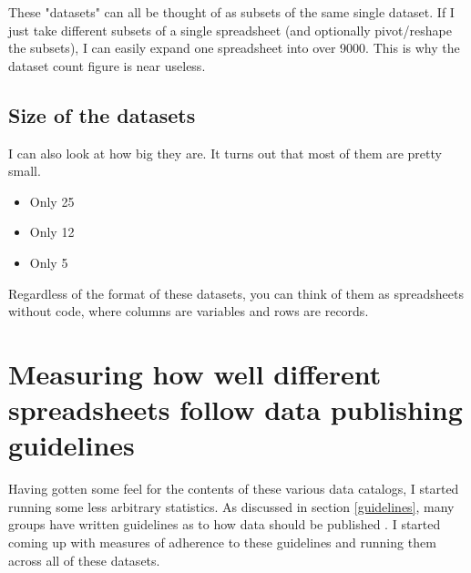 \documentclass{acm_proc_article-sp}
\begin{document}
These "datasets" can all be thought of as subsets of the same single dataset.
If I just take different subsets of a single spreadsheet (and optionally
pivot/reshape the subsets), I can easily expand one spreadsheet into over 9000.
This is why the dataset count figure is near useless.

\subsection{Size of the datasets}
I can also look at how big they are.
It turns out that most of them are pretty small.

\begin{itemize}
\item Only 25%
\item Only 12%
\item Only 5%
\end{itemize}


Regardless of the format of these datasets, you can think of them as
spreadsheets without code, where columns are variables and rows are records.

\section{Measuring how well different spreadsheets follow data publishing guidelines}
Having gotten some feel for the contents of these various data catalogs,
I started running some less arbitrary statistics.
As discussed in section \ref{guidelines}, many groups have written guidelines
as to how data should be published
\cite{open-data-census,fivestars,sunlight,sebastopol,odi}.
I started coming up with measures of adherence to these guidelines and running
them across all of these datasets.
\end{document}
